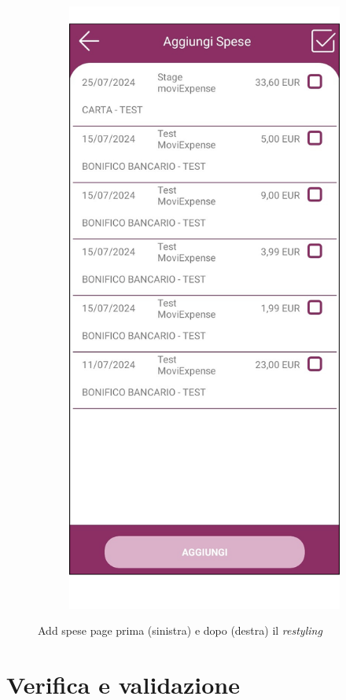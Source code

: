 \begin{figure}[H]
\begin{subfigure}{.5\textwidth}
        \includegraphics[width=.7\columnwidth]{images/screenshot/new/addSpese.png}\vspace{2mm}
    \end{subfigure}
    \caption{Add spese page prima (sinistra) e dopo (destra) il \emph{restyling}}
\end{figure}

\section{Verifica e validazione}


